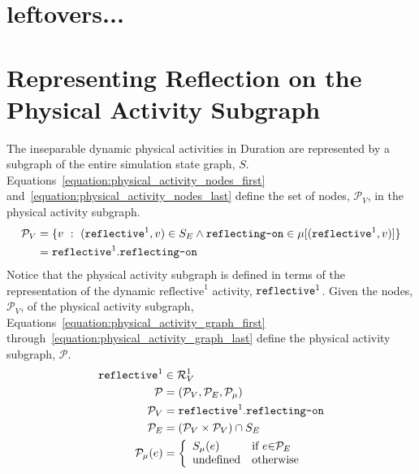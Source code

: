 \section{leftovers...}

\section{Representing Reflection on the Physical Activity Subgraph}

The inseparable dynamic physical activities in Duration are
represented by a subgraph of the entire simulation state graph, $S$.
{\mbox{Equations~\ref{equation:physical_activity_nodes_first}}}
{\mbox{and~\ref{equation:physical_activity_nodes_last}}} define the
set of nodes, $\mathcal{P}_V$, in the physical activity subgraph.
\begin{align}
\label{equation:physical_activity_nodes_first}
  \mathcal{P}_V &= \{v ~:~ (\text{\tt{reflective}}^1, v) \in S_E \wedge \text{\tt{reflecting-on}} \in \mu[(\text{\tt{reflective}}^1, v)]\} \\
\label{equation:physical_activity_nodes_last}
                &= \text{\tt{reflective}}^1.\text{\tt{reflecting-on}}
\end{align}
Notice that the physical activity subgraph is defined in terms of the
representation of the dynamic $\text{reflective}^1$ activity,
$\text{\tt{reflective}}^1$.  Given the nodes, $\mathcal{P}_V$, of the
physical activity subgraph,
{\mbox{Equations~\ref{equation:physical_activity_graph_first}}}
{\mbox{through~\ref{equation:physical_activity_graph_last}}} define
the physical activity subgraph, $\mathcal{P}$.
\begin{align}
\label{equation:physical_activity_graph_first}
           \text{\tt{reflective}}^1 &\in \mathcal{R}^1_V \\
                        \mathcal{P} &= (\mathcal{P}_V, \mathcal{P}_E, \mathcal{P}_\mu) \\
                      \mathcal{P}_V &= \text{\tt{reflective}}^1.\text{\tt{reflecting-on}} \\
                      \mathcal{P}_E &= (\mathcal{P}_V \times \mathcal{P}_V) \cap S_E \\
\label{equation:physical_activity_graph_last}
\mathcal{P}_\mu(e) &=
   {\left\{
      \begin{array}{ll}
        S_\mu(e) & \text{if }e {\in} \mathcal{P}_E \\
        \text{undefined}          & \text{otherwise}
      \end{array}
    \right.}
\end{align}

